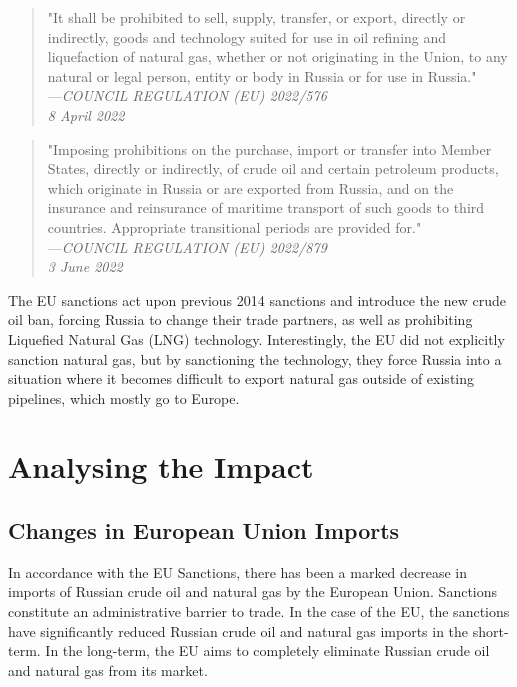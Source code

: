 \documentclass[12pt]{article}
\begin{document}
\begin{quote}
    "It shall be prohibited to sell, supply, transfer, or export, directly or indirectly, goods and technology suited for use in oil refining and liquefaction of natural gas, whether or not originating in the Union, to any natural or legal person, entity or body in Russia or for use in Russia." \\
    ---\textit{COUNCIL REGULATION (EU) 2022/576 \\ 8 April 2022}
\end{quote}

\begin{quote}
    "Imposing prohibitions on the purchase, import or transfer into Member States, directly or indirectly, of crude oil and certain petroleum products, which originate in Russia or are exported from Russia, and on the insurance and reinsurance of maritime transport of such goods to third countries. Appropriate transitional periods are provided for." \\
    ---\textit{COUNCIL REGULATION (EU) 2022/879 \\ 3 June 2022}
\end{quote}

The EU sanctions act upon previous 2014 sanctions and introduce the new crude oil ban, forcing Russia to change their trade partners, as well as prohibiting Liquefied Natural Gas (LNG) technology. Interestingly, the EU did not explicitly sanction natural gas, but by sanctioning the technology, they force Russia into a situation where it becomes difficult to export natural gas outside of existing pipelines, which mostly go to Europe. 

\section{Analysing the Impact}

\subsection{Changes in European Union Imports}

In accordance with the EU Sanctions, there has been a marked decrease in imports of Russian crude oil and natural gas by the European Union. Sanctions constitute an administrative barrier to trade. In the case of the EU, the sanctions have significantly reduced Russian crude oil and natural gas imports in the short-term. In the long-term, the EU aims to completely eliminate Russian crude oil and natural gas from its market. 
\end{document}
